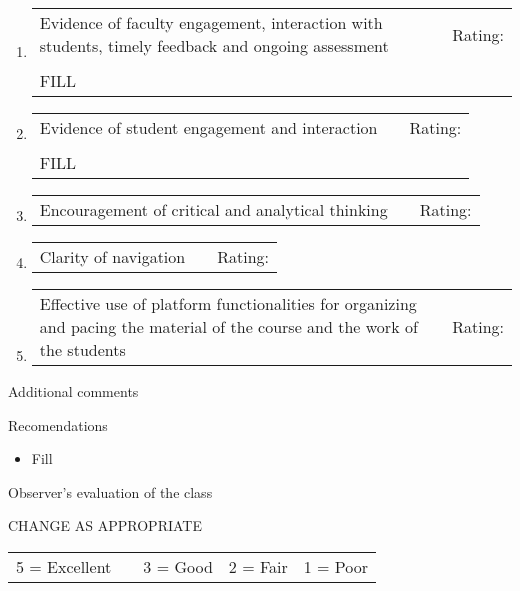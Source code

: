 \documentclass[11pt,dvipsnames]{article}
\begin{document}
\begin{enumerate}[label= {\bf  \arabic*:}]
\begin{tabular}[t]{p{}  p{3cm} p{3cm} }
\end{tabular}
\item 	\begin{tabular}[t]{p{}  p{3cm} p{3cm} }
Evidence of faculty engagement, interaction with students, timely feedback and ongoing assessment & & Rating: \\
& &\\
FILL & & \\
\end{tabular}
\item 	\begin{tabular}[t]{p{}  p{3cm} p{3cm} }
	Evidence of student engagement and interaction & & Rating: \\
	& &\\
	FILL & &\\
\end{tabular}
\item 	\begin{tabular}[t]{p{}  p{3cm} p{3cm} }
	Encouragement of critical and analytical thinking & & Rating: 
\end{tabular}
\item 	\begin{tabular}[t]{p{}  p{3cm} p{3cm} }
	Clarity of navigation & & Rating: 
\end{tabular}
\item 	\begin{tabular}[t]{p{}  p{3cm} p{3cm} }
	Effective use of platform functionalities for organizing and
	pacing the material of the course and the work of the students & & Rating: 
\end{tabular}
\end{enumerate}
\vskip 1cm
{\large Additional comments}

\vskip 5cm %

\vskip 1cm
{\large Recomendations}
\vskip 5cm %

\begin{itemize}
	\item Fill
	
	
	
\end{itemize}
\vskip 1cm
{\large Observer's evaluation of the class}

CHANGE AS APPROPRIATE

{\tabulinesep=1.2mm
	\begin{tabu}{c  c c c c  }
		
		5 = Excellent   & {} & 3 = Good & 2 = Fair & 1 = Poor   \\ 	
	\end{tabu}}
\end{document}
